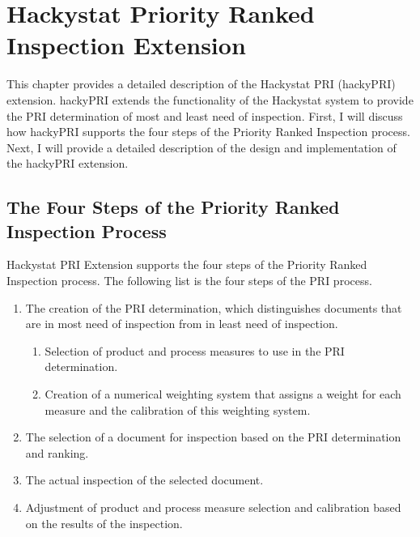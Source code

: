 
\chapter{Hackystat Priority Ranked Inspection Extension}
\label{chapter:system}
This chapter provides a detailed description of the Hackystat PRI
(hackyPRI) extension. hackyPRI extends the functionality of the Hackystat
system to provide the PRI determination of most and least need of
inspection. First, I will discuss how hackyPRI supports the four steps of
the Priority Ranked Inspection process. Next, I will provide a detailed
description of the design and implementation of the hackyPRI extension.

\section{The Four Steps of the Priority Ranked Inspection Process}
Hackystat PRI Extension supports the four steps of the Priority Ranked
Inspection process. The following list is the four steps of the PRI
process. 

\begin{enumerate}
\item The creation of the PRI determination, which distinguishes documents
  that are in most need of inspection from in least need of inspection. 
\begin{enumerate}
\item Selection of product and process measures to use in the PRI
  determination.
\item Creation of a numerical weighting system that assigns a weight for
  each measure and the calibration of this weighting system.
\end{enumerate}
\item The selection of a document for inspection based on the PRI
  determination and ranking.
\item The actual inspection of the selected document.
\item Adjustment of product and process measure selection and
  calibration based on the results of the inspection.
\end{enumerate}

